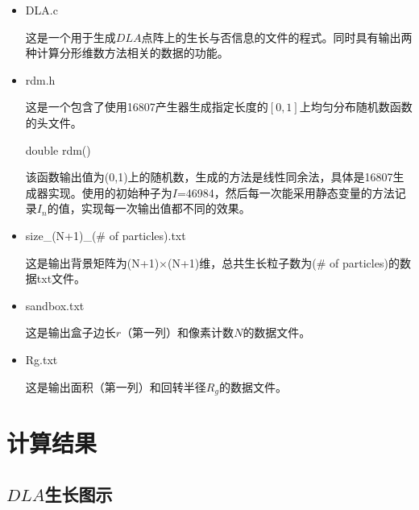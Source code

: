 \documentclass[UTF8]{ctexart}
\begin{document}
	\begin{itemize}
	\item DLA.c
	
	这是一个用于生成$DLA$点阵上的生长与否信息的文件的程式。同时具有输出两种计算分形维数方法相关的数据的功能。
	
	
	\item rdm.h

	这是一个包含了使用16807产生器生成指定长度的$[0,1]$上均匀分布随机数函数的头文件。

	\subitem double rdm()

	该函数输出值为(0,1)上的随机数，生成的方法是线性同余法，具体是16807生成器实现。使用的初始种子为$I$=46984，然后每一次能采用静态变量的方法记录$I_n$的值，实现每一次输出值都不同的效果。
	
	\item size\_(N+1)\_(\# of particles).txt
	
	这是输出背景矩阵为(N+1)$\times$(N+1)维，总共生长粒子数为(\# of particles)的数据txt文件。
	
	\item sandbox.txt
	
	这是输出盒子边长$r$（第一列）和像素计数$N$的数据文件。
	
	\item Rg.txt
	
	这是输出面积（第一列）和回转半径$R_g$的数据文件。
	

	\end{itemize}
	
	
		
	
	\section{计算结果}
	
	\subsection{$DLA$生长图示}
	
\end{document}
